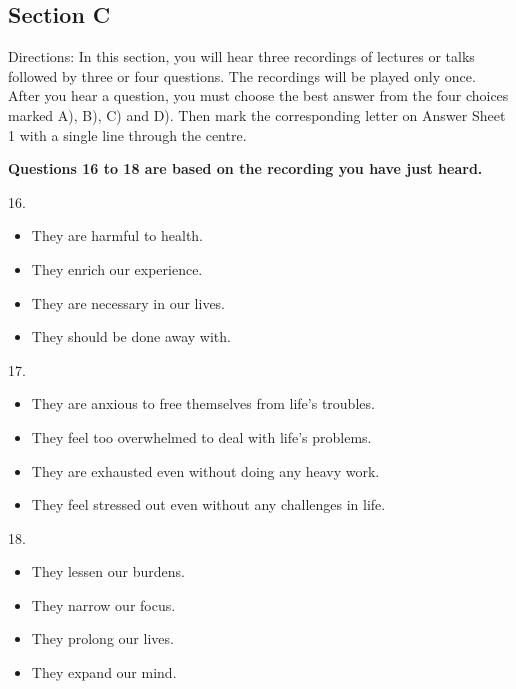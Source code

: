 \documentclass[UTF8,11pt]{ctexart}
\begin{document}
\subsection*{\textbf{Section C}}


Directions: In this section, you will hear three recordings of lectures or talks followed by three or four questions. The recordings will be played only once. After you hear a question, you must choose the best answer from the four choices marked A), B), C) and D). Then mark the corresponding letter on Answer Sheet 1 with a single line through the centre.


\textbf{Questions 16 to 18 are based on the recording you have just heard.}


16.


\begin{itemize}[leftmargin=2em,itemsep=.2em,topsep=.4em]\item[A.] They are harmful to health.
\item[B.] They enrich our experience.
\item[C.] They are necessary in our lives.
\item[D.] They should be done away with.
\end{itemize}

17.


\begin{itemize}[leftmargin=2em,itemsep=.2em,topsep=.4em]\item[A.] They are anxious to free themselves from life’s troubles.
\item[B.] They feel too overwhelmed to deal with life’s problems.
\item[C.] They are exhausted even without doing any heavy work.
\item[D.] They feel stressed out even without any challenges in life.
\end{itemize}

18.


\begin{itemize}[leftmargin=2em,itemsep=.2em,topsep=.4em]\item[A.] They lessen our burdens.
\item[B.] They narrow our focus.
\end{itemize}

\begin{itemize}[leftmargin=2em,itemsep=.2em,topsep=.4em]\item[C.] They prolong our lives.
\item[D.] They expand our mind.
\end{itemize}
\end{document}
